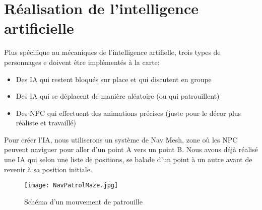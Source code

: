 \documentclass[../doc.tex]{subfiles}
\begin{document}
\section{Réalisation de l'intelligence artificielle}
Plus spécifique au mécaniques de l'intelligence artifielle,
 trois types de personnages e doivent être implémentés à la carte:
\begin{itemize}
    \item Des IA qui restent bloqués sur place et qui discutent en groupe
    \item Des IA qui se déplacent de manière aléatoire (ou qui patrouillent)
    \item Des NPC qui effectuent des animations précises
        (juste pour le décor plus réaliste et travaillé)
\end{itemize}

Pour créer l'IA, nous utiliserons un système de Nav Mesh, zone où les NPC peuvent naviguer pour aller d'un point A vers un point B.
Nous avons déjà réalisé une IA qui selon une liste de positions, se balade d'un point à un autre avant de revenir à sa position initiale.

\begin{figure}
    \centering
    \texttt{[image: NavPatrolMaze.jpg]}
    \caption{Schéma d'un mouvement de patrouille}
\end{figure}
\end{document}
